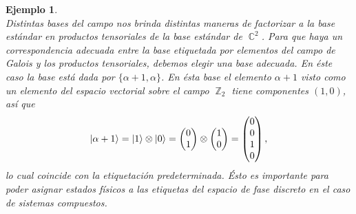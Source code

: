 \documentclass[a4paper]{report}
\DeclareMathOperator{\C}{\mathbb{C}}
\DeclareMathOperator{\Z}{\mathbb{Z}}
\newtheorem{example}{Ejemplo}
\begin{document}
\begin{example}
\[    \] 
    Distintas bases del campo nos brinda distintas maneras
    de factorizar a la base estándar en productos
    tensoriales de la base estándar de $\C^2$. Para que haya
    un correspondencia adecuada entre la base etiquetada por
    elementos del campo de Galois y los productos
    tensoriales, debemos elegir una base adecuada.  En éste
    caso la base está dada por $\{\alpha + 1, \alpha\}$. En
    ésta base el elemento $\alpha + 1$ visto como un
    elemento del espacio vectorial sobre el campo $\Z_2$
    tiene componentes $(1,0)$, así que 
    \[
      \ket{\alpha + 1}
      = \ket{1} \otimes \ket{0}
      = \begin{pmatrix} 0\\1 \end{pmatrix} 
      \otimes
      \begin{pmatrix} 1\\0 \end{pmatrix} 
      = \begin{pmatrix} 0\\0\\1\\0 \end{pmatrix},
    \] 
    lo cual coincide con la etiquetación predeterminada.
    Ésto es importante para poder asignar estados físicos a
    las etiquetas del espacio de fase discreto en el caso de
    sistemas compuestos.


\end{example}
\end{document}
